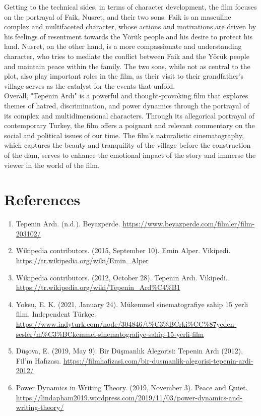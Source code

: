 \documentclass[12pt]{article}
\begin{document}
\par
Getting to the technical sides, in terms of character development, the film focuses on the portrayal of Faik, Nusret, and their two sons. Faik is an masculine complex and multifaceted character, whose actions and motivations are driven by his feelings of resentment towards the Yörük people and his desire to protect his land. Nusret, on the other hand, is a more compassionate and understanding character, who tries to mediate the conflict between Faik and the Yörük people and maintain peace within the family. The two sons, while not as central to the plot, also play important roles in the film, as their visit to their grandfather's village serves as the catalyst for the events that unfold.
\\
Overall, "Tepenin Ardı" is a powerful and thought-provoking film that explores themes of hatred, discrimination, and power dynamics through the portrayal of its complex and multidimensional characters. Through its allegorical portrayal of contemporary Turkey, the film offers a poignant and relevant commentary on the social and political issues of our time. The film's naturalistic cinematography, which captures the beauty and tranquility of the village before the construction of the dam, serves to enhance the emotional impact of the story and immerse the viewer in the world of the film.

\section*{References}

\begin{enumerate}
        \item Tepenin Ardı. (n.d.). Beyazperde. \url{https://www.beyazperde.com/filmler/film-203102/}
        \item Wikipedia contributors. (2015, September 10). Emin Alper. Vikipedi. \url{https://tr.wikipedia.org/wiki/Emin_Alper}
        \item Wikipedia contributors. (2012, October 28). Tepenin Ardı. Vikipedi. \url{https://tr.wikipedia.org/wiki/Tepenin_Ard%C4%B1}
        \item Yoksu, E. K. (2021, January 24). Mükemmel sinematografiye sahip 15 yerli film. Independent Türkçe. \url{https://www.indyturk.com/node/304846/t%C3%BCrki%CC%87yeden-sesler/m%C3%BCkemmel-sinematografiye-sahip-15-yerli-film}
        \item Düşova, E. (2019, May 9). Bir Düşmanlık Alegorisi: Tepenin Ardı (2012). Fil’m Hafızası. \url{https://filmhafizasi.com/bir-dusmanlik-alegorisi-tepenin-ardi-2012/}
        \item Power Dynamics in Writing Theory. (2019, November 3). Peace and Quiet. \url{https://lindapham2019.wordpress.com/2019/11/03/power-dynamics-and-writing-theory/}
\end{enumerate}
\end{document}
